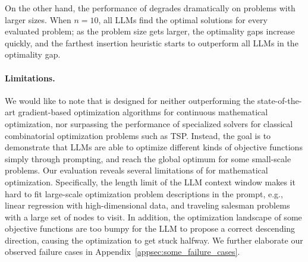 On the other hand, the performance of \name{} degrades dramatically on problems with larger sizes. When $n=10$, all LLMs find the optimal solutions for every evaluated problem; as the problem size gets larger, the \name{} optimality gaps increase quickly, and the farthest insertion heuristic starts to outperform all LLMs in the optimality gap.

\paragraph{Limitations.} We would like to note that \name{} is designed for neither outperforming the state-of-the-art gradient-based optimization algorithms for continuous mathematical optimization, nor surpassing the performance of specialized solvers for classical combinatorial optimization problems such as TSP. Instead, the goal is to demonstrate that LLMs are able to optimize different kinds of objective functions simply through prompting, and reach the global optimum for some small-scale problems.
Our evaluation reveals several limitations of \name{} for mathematical optimization.
Specifically, the length limit of the LLM context window makes it hard to fit large-scale optimization problem descriptions in the prompt, e.g., linear regression with high-dimensional data, and traveling salesman problems with a large set of nodes to visit. In addition, the optimization landscape of some objective functions are too bumpy for the LLM to propose a correct descending direction, causing the optimization to get stuck halfway. We further elaborate our observed failure cases in Appendix~\ref{appsec:some_failure_cases}.